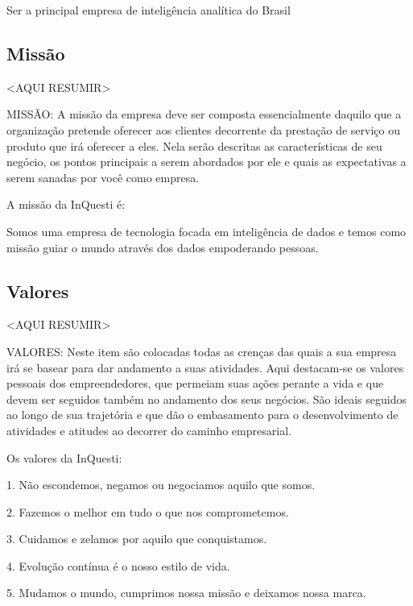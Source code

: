 Ser a principal empresa de inteligência analítica do Brasil

\subsection{Missão}
<AQUI RESUMIR>

MISSÃO: A missão da empresa deve ser composta essencialmente daquilo que a organização pretende oferecer aos clientes decorrente da prestação de serviço ou produto que irá oferecer a eles. Nela serão descritas as características de seu negócio, os pontos principais a serem abordados por ele e quais as expectativas a serem sanadas por você como empresa.

A missão da InQuesti é:

Somos uma empresa de tecnologia focada em inteligência de dados e temos como missão guiar o mundo através dos dados empoderando pessoas.

\subsection{Valores}
<AQUI RESUMIR>

VALORES: Neste item são colocadas todas as crenças das quais a sua empresa irá se basear para dar andamento a suas atividades. Aqui destacam-se os valores pessoais dos empreendedores, que permeiam suas ações perante a vida e que devem ser seguidos também no andamento dos seus negócios. São ideais seguidos ao longo de sua trajetória e que dão o embasamento para o desenvolvimento de atividades e atitudes ao decorrer do caminho empresarial.

Os valores da InQuesti:

1. Não escondemos, negamos ou negociamos aquilo que somos.

2. Fazemos o melhor em tudo o que nos comprometemos.

3. Cuidamos e zelamos por aquilo que conquistamos.

4. Evolução contínua é o nosso estilo de vida.

5. Mudamos o mundo, cumprimos nossa missão e deixamos nossa marca.